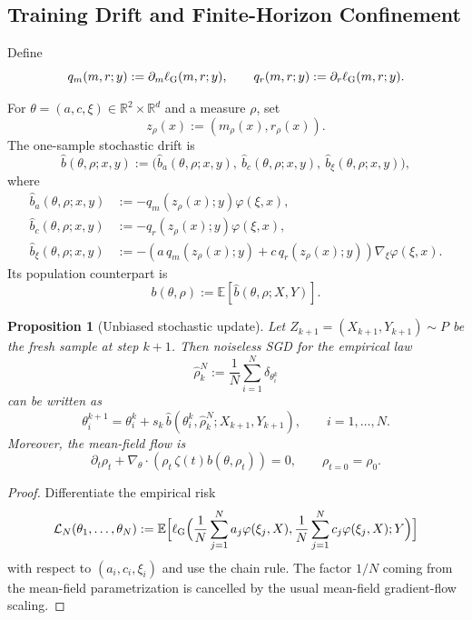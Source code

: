 \documentclass[11pt]{article}
\newtheorem{proposition}[theorem]{Proposition}
\theoremstyle{definition}
\newcommand{\R}{\mathbb{R}}
\newcommand{\E}{\mathbb{E}}
\newcommand{\mc}[1]{\mathcal{#1}}
\begin{document}
\subsection{Training Drift and Finite-Horizon Confinement}

Define
\[
  q_m(m,r;y):=\partial_m \ell_{\rm G}(m,r;y),
  \qquad
  q_r(m,r;y):=\partial_r \ell_{\rm G}(m,r;y).
\]

For $\theta=(a,c,\xi)\in\R^2\times\R^d$ and a measure $\rho$, set
\[
  z_\rho(x):=(m_\rho(x),r_\rho(x)).
\]
The one-sample stochastic drift is
\begin{equation}
  \hat b(\theta,\rho;x,y)
  :=
  \bigl(
    \hat b_a(\theta,\rho;x,y),\
    \hat b_c(\theta,\rho;x,y),\
    \hat b_\xi(\theta,\rho;x,y)
  \bigr),
  \label{eq:sample-drift}
\end{equation}
where
\begin{align}
  \hat b_a(\theta,\rho;x,y)
  &:=
  -q_m(z_\rho(x);y)\varphi(\xi,x),
  \label{eq:sample-drift-a}
  \\
  \hat b_c(\theta,\rho;x,y)
  &:=
  -q_r(z_\rho(x);y)\varphi(\xi,x),
  \label{eq:sample-drift-c}
  \\
  \hat b_\xi(\theta,\rho;x,y)
  &:=
  -(a\,q_m(z_\rho(x);y)+c\,q_r(z_\rho(x);y))\nabla_\xi\varphi(\xi,x).
  \label{eq:sample-drift-xi}
\end{align}
Its population counterpart is
\begin{equation}
  b(\theta,\rho)
  :=
  \E[\hat b(\theta,\rho;X,Y)].
  \label{eq:population-drift}
\end{equation}

\begin{proposition}[Unbiased stochastic update]
\label{prop:unbiased}
Let $Z_{k+1}=(X_{k+1},Y_{k+1})\sim P$ be the fresh sample at step $k+1$. Then
noiseless SGD for the empirical law
\[
  \hat\rho_k^N:=\frac1N\sum_{i=1}^N \delta_{\theta_i^k}
\]
can be written as
\begin{equation}
  \theta_i^{k+1}
  =
  \theta_i^k
  +
  s_k\,\hat b(\theta_i^k,\hat\rho_k^N;X_{k+1},Y_{k+1}),
  \qquad
  i=1,\dots,N.
  \label{eq:sgd-update}
\end{equation}
Moreover, the mean-field flow is
\begin{equation}
  \partial_t \rho_t
  +
  \nabla_\theta\cdot(\rho_t\,\zeta(t)b(\theta,\rho_t))
  =
  0,
  \qquad
  \rho_{t=0}=\rho_0.
  \label{eq:mf-pde}
\end{equation}
\end{proposition}

\begin{proof}
Differentiate the empirical risk
\[
  \mc{L}_N(\theta_1,\dots,\theta_N)
  :=
  \E\Bigl[
    \ell_{\rm G}\Bigl(
      \frac1N\sum_{j=1}^N a_j\varphi(\xi_j,X),
      \frac1N\sum_{j=1}^N c_j\varphi(\xi_j,X);
      Y
    \Bigr)
  \Bigr]
\]
with respect to $(a_i,c_i,\xi_i)$ and use the chain rule. The factor $1/N$
coming from the mean-field parametrization is cancelled by the usual mean-field
gradient-flow scaling.
\end{proof}
\end{document}

